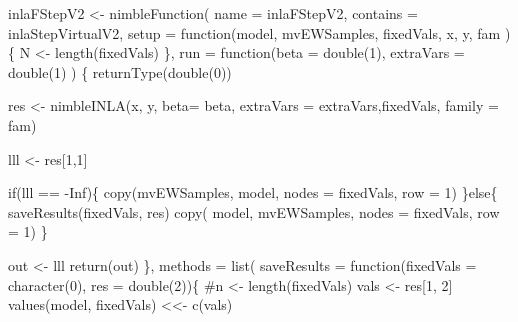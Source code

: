 \documentclass[
]{article}
\newenvironment{Shaded}{\begin{snugshade}}{\end{snugshade}}
\newcommand{\AttributeTok}[1]{\textcolor[rgb]{0.40,0.45,0.13}{#1}}
\newcommand{\CommentTok}[1]{\textcolor[rgb]{0.37,0.37,0.37}{#1}}
\newcommand{\ConstantTok}[1]{\textcolor[rgb]{0.56,0.35,0.01}{#1}}
\newcommand{\ControlFlowTok}[1]{\textcolor[rgb]{0.00,0.23,0.31}{#1}}
\newcommand{\DecValTok}[1]{\textcolor[rgb]{0.68,0.00,0.00}{#1}}
\newcommand{\FunctionTok}[1]{\textcolor[rgb]{0.28,0.35,0.67}{#1}}
\newcommand{\NormalTok}[1]{\textcolor[rgb]{0.00,0.23,0.31}{#1}}
\newcommand{\OtherTok}[1]{\textcolor[rgb]{0.00,0.23,0.31}{#1}}
\newcommand{\SpecialCharTok}[1]{\textcolor[rgb]{0.37,0.37,0.37}{#1}}
\newcommand{\StringTok}[1]{\textcolor[rgb]{0.13,0.47,0.30}{#1}}
\begin{document}
\begin{Shaded}
\begin{Highlighting}[]
\NormalTok{inlaFStepV2 }\OtherTok{\textless{}{-}} \FunctionTok{nimbleFunction}\NormalTok{(}
  \AttributeTok{name =} \StringTok{\textquotesingle{}inlaFStepV2\textquotesingle{}}\NormalTok{,}
  \AttributeTok{contains =}\NormalTok{ inlaStepVirtualV2,}
  \AttributeTok{setup =} \ControlFlowTok{function}\NormalTok{(model,}
\NormalTok{                   mvEWSamples,}
\NormalTok{                   fixedVals,}
\NormalTok{                   x,}
\NormalTok{                   y,}
\NormalTok{                   fam}
\NormalTok{  ) \{}
\NormalTok{    N }\OtherTok{\textless{}{-}} \FunctionTok{length}\NormalTok{(fixedVals)}
\NormalTok{  \},}
  \AttributeTok{run =} \ControlFlowTok{function}\NormalTok{(}\AttributeTok{beta =} \FunctionTok{double}\NormalTok{(}\DecValTok{1}\NormalTok{),}
                 \AttributeTok{extraVars =} \FunctionTok{double}\NormalTok{(}\DecValTok{1}\NormalTok{)}
\NormalTok{  ) \{}
    \FunctionTok{returnType}\NormalTok{(}\FunctionTok{double}\NormalTok{(}\DecValTok{0}\NormalTok{))}

\NormalTok{    res }\OtherTok{\textless{}{-}} \FunctionTok{nimbleINLA}\NormalTok{(x, y, }\AttributeTok{beta=}\NormalTok{ beta, }\AttributeTok{extraVars =}\NormalTok{ extraVars,fixedVals,  }\AttributeTok{family =}\NormalTok{ fam)}

\NormalTok{    lll }\OtherTok{\textless{}{-}}\NormalTok{ res[}\DecValTok{1}\NormalTok{,}\DecValTok{1}\NormalTok{]}

    \ControlFlowTok{if}\NormalTok{(lll }\SpecialCharTok{==} \SpecialCharTok{{-}}\ConstantTok{Inf}\NormalTok{)\{}
      \FunctionTok{copy}\NormalTok{(mvEWSamples, model, }\AttributeTok{nodes =}\NormalTok{ fixedVals, }\AttributeTok{row =} \DecValTok{1}\NormalTok{)}
\NormalTok{    \}}\ControlFlowTok{else}\NormalTok{\{}
      \FunctionTok{saveResults}\NormalTok{(fixedVals, res)}
      \FunctionTok{copy}\NormalTok{( model, mvEWSamples, }\AttributeTok{nodes =}\NormalTok{ fixedVals, }\AttributeTok{row =} \DecValTok{1}\NormalTok{)}
\NormalTok{    \}}

\NormalTok{    out }\OtherTok{\textless{}{-}}\NormalTok{ lll}
    \FunctionTok{return}\NormalTok{(out)}
\NormalTok{  \},}
  \AttributeTok{methods =} \FunctionTok{list}\NormalTok{(}
    \AttributeTok{saveResults =} \ControlFlowTok{function}\NormalTok{(}\AttributeTok{fixedVals =} \FunctionTok{character}\NormalTok{(}\DecValTok{0}\NormalTok{),}
                           \AttributeTok{res =} \FunctionTok{double}\NormalTok{(}\DecValTok{2}\NormalTok{))\{}
      \CommentTok{\#n \textless{}{-} length(fixedVals)}
\NormalTok{      vals }\OtherTok{\textless{}{-}}\NormalTok{ res[}\DecValTok{1}\NormalTok{, }\DecValTok{2}\NormalTok{]}
      \FunctionTok{values}\NormalTok{(model, fixedVals) }\OtherTok{\textless{}\textless{}{-}} \FunctionTok{c}\NormalTok{(vals)}


\end{Highlighting}
\end{Shaded}
\end{document}
